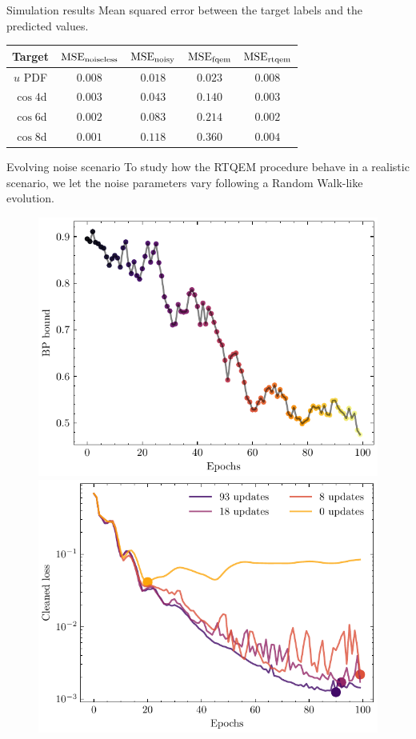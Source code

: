\documentclass[20pt, final]{beamer}
\newlength{\colwidth}
\begin{document}
\begin{frame}[t]
\begin{columns}[t]
\begin{column}{\colwidth}
\begin{alertblock}{Simulation results}
Mean squared error between the target labels and the predicted values.
\begin{center}
\begin{tabular}{ccccc}
\hline \hline 
\textbf{Target} & $\text{MSE}_{\rm noiseless}$ & $\text{MSE}_{\rm noisy}$ & $\text{MSE}_{\rm fqem}$ & $\text{MSE}_{\rm rtqem}$\\
\hline
$u$ PDF    &  $0.008$  & $0.018$  & $0.023$ & $0.008$ \\
$\cos 4$d  &  $0.003$  & $0.043$  & $0.140$ & $0.003$ \\
$\cos 6$d  &  $0.002$  & $0.083$  & $0.214$ & $0.002$ \\
$\cos 8$d  &  $0.001$  & $0.118$  & $0.360$ & $0.004$ \\
\hline \hline
\end{tabular}
\end{center}
\end{alertblock}

\begin{block}{Evolving noise scenario}
To study how the RTQEM procedure behave in a realistic scenario, we let the noise 
parameters vary following a Random Walk-like evolution.
\begin{figure}
  \centering
    \includegraphics[width=0.49\linewidth]{figures/bound_variation.pdf}%
    \includegraphics[width=0.5\linewidth]{figures/cleaned_losses.pdf}%
    \label{fig:ndim_simulation}
  \end{figure}
\end{block}




\end{column}
\end{columns}
\end{frame}
\end{document}
